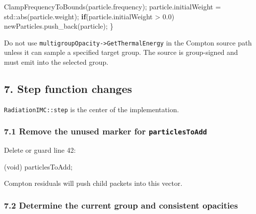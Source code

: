 \documentclass[
]{article}
\newenvironment{Shaded}{}{}
\newcommand{\BuiltInTok}[1]{\textcolor[rgb]{0.00,0.50,0.00}{#1}}
\newcommand{\ControlFlowTok}[1]{\textcolor[rgb]{0.00,0.44,0.13}{\textbf{#1}}}
\newcommand{\DataTypeTok}[1]{\textcolor[rgb]{0.56,0.13,0.00}{#1}}
\newcommand{\FloatTok}[1]{\textcolor[rgb]{0.25,0.63,0.44}{#1}}
\newcommand{\NormalTok}[1]{#1}
\newcommand{\OperatorTok}[1]{\textcolor[rgb]{0.40,0.40,0.40}{#1}}
\begin{document}
\begin{Shaded}
\begin{Highlighting}[]
\NormalTok{    ClampFrequencyToBounds}\OperatorTok{(}\NormalTok{particle}\OperatorTok{.}\NormalTok{frequency}\OperatorTok{);}
\NormalTok{    particle}\OperatorTok{.}\NormalTok{initialWeight }\OperatorTok{=} \BuiltInTok{std::}\NormalTok{abs}\OperatorTok{(}\NormalTok{particle}\OperatorTok{.}\NormalTok{weight}\OperatorTok{);}
    \ControlFlowTok{if}\OperatorTok{(}\NormalTok{particle}\OperatorTok{.}\NormalTok{initialWeight }\OperatorTok{\textgreater{}} \FloatTok{0.0}\OperatorTok{)}
\NormalTok{        newParticles}\OperatorTok{.}\NormalTok{push\_back}\OperatorTok{(}\NormalTok{particle}\OperatorTok{);}
\OperatorTok{\}}
\end{Highlighting}
\end{Shaded}

Do not use \texttt{multigroupOpacity-\textgreater{}GetThermalEnergy} in
the Compton source path unless it can sample a specified target group.
The source is group-signed and must emit into the selected group.

\subsection{7. Step function changes}\label{step-function-changes}

\texttt{RadiationIMC::step} is the center of the implementation.

\subsubsection{\texorpdfstring{7.1 Remove the unused marker for
\texttt{particlesToAdd}}{7.1 Remove the unused marker for particlesToAdd}}\label{remove-the-unused-marker-for-particlestoadd}

Delete or guard line 42:

\begin{Shaded}
\begin{Highlighting}[]
\OperatorTok{(}\DataTypeTok{void}\OperatorTok{)}\NormalTok{ particlesToAdd}\OperatorTok{;}
\end{Highlighting}
\end{Shaded}

Compton residuals will push child packets into this vector.

\subsubsection{7.2 Determine the current group and consistent
opacities}\label{determine-the-current-group-and-consistent-opacities}
\end{document}
